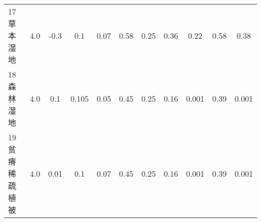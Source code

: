 \begin{landscape}
\begin{table}[htbp]
\begin{tabular}{@{}lcccccccccc@{}}
        17 草本湿地    & 4.0        & -0.3                                                                         & 0.1                                                                                                             & 0.07                                                                                                            & 0.58                                                                                                            & 0.25                                                                                                            & 0.36                                                                                                            & 0.22                                                                                                            & 0.58                                                                                                            & 0.38                                                                                                            \\
        18 森林湿地    & 4.0        & 0.1                                                                          & 0.105                                                                                                           & 0.05                                                                                                            & 0.45                                                                                                            & 0.25                                                                                                            & 0.16                                                                                                            & 0.001                                                                                                           & 0.39                                                                                                            & 0.001                                                                                                           \\
        19 贫瘠稀疏植被  & 4.0        & 0.01                                                                         & 0.1                                                                                                             & 0.07                                                                                                            & 0.45                                                                                                            & 0.25                                                                                                            & 0.16                                                                                                            & 0.001                                                                                                           & 0.39                                                                                                            & 0.001                                                                                                           \\

\end{tabular}
\end{table}
\end{landscape}
